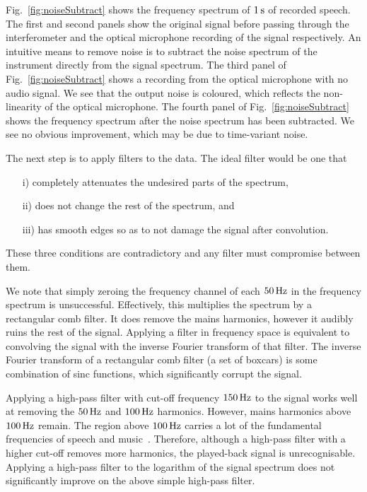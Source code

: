 \documentclass[paper-main.tex]{subfiles}
\begin{document}
Fig.~\ref{fig:noiseSubtract} shows the frequency spectrum of $1\,{\rm s}$ of recorded speech. 
The first and second panels show the original signal before passing through the interferometer and the optical microphone recording of the signal respectively. 
An intuitive means to remove noise is to subtract the noise spectrum of the instrument directly from the signal spectrum. 
The third panel of Fig.~\ref{fig:noiseSubtract} shows a recording from the optical microphone with no audio signal. 
We see that the output noise is coloured, which reflects the non-linearity of the optical microphone.
The fourth panel of Fig.~\ref{fig:noiseSubtract} shows the frequency spectrum after the noise spectrum has been subtracted. 
We see no obvious improvement, which may be due to time-variant noise. 


The next step is to apply filters to the data. 
The ideal filter would be one that 
\begin{itemize}
\item[i)] completely attenuates the undesired parts of the spectrum, 
\item[ii)] does not change the rest of the spectrum, and 
\item[iii)] has smooth edges so as to not damage the signal after convolution. 
\end{itemize}
These three conditions are contradictory and any filter must compromise between them. 

We note that simply zeroing the frequency channel of each $50\,{\rm Hz}$ in the frequency spectrum is unsuccessful. 
Effectively, this multiplies the spectrum by a rectangular comb filter. 
It does remove the mains harmonics, however it audibly ruins the rest of the signal. 
Applying a filter in frequency space is equivalent to convolving the signal with the inverse Fourier transform of that filter. 
The inverse Fourier transform of a rectangular comb filter (a set of boxcars) is some combination of sinc functions, which significantly corrupt the signal. 


Applying a high-pass filter with cut-off frequency $150\,{\rm Hz}$ to the signal works well at removing the $50\,{\rm Hz}$ and $100\,{\rm Hz}$ harmonics.
However, mains harmonics above $100\,{\rm Hz}$ remain. 
The region above $100\,{\rm Hz}$ carries a lot of the fundamental frequencies of speech and music~\cite{speech_intelligibility}. 
Therefore, although a high-pass filter with a higher cut-off removes more harmonics, the played-back signal is unrecognisable. 
Applying a high-pass filter to the logarithm of the signal spectrum does not significantly improve on the above simple high-pass filter.
\end{document}
